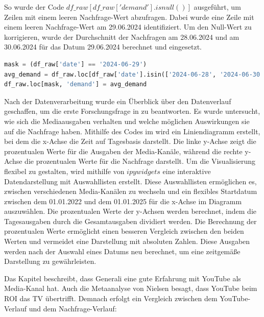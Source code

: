 So wurde der Code \(df\_raw[df\_raw['demand'].isnull()]\) ausgeführt, um Zeilen mit einem leeren Nachfrage-Wert abzufragen. Dabei wurde eine Zeile mit einem leeren Nachfrage-Wert am 29.06.2024 identifiziert. Um den Null-Wert zu korrigieren, wurde der Durchschnitt der Nachfragen am 28.06.2024 und am 30.06.2024 für das Datum 29.06.2024 berechnet und eingesetzt.  
\begin{lstlisting}[language=Python, linewidth=\textwidth]
mask = (df_raw['date'] == '2024-06-29')
avg_demand = df_raw.loc[df_raw['date'].isin(['2024-06-28', '2024-06-30']), 'demand'].mean()
df_raw.loc[mask, 'demand'] = avg_demand
\end{lstlisting}
Nach der Datenverarbeitung wurde ein Überblick über den Datenverlauf geschaffen, um die erste Forschungsfrage in 
zu beantworten. Es wurde untersucht, wie sich die Mediaausgaben verhalten und welche möglichen Auswirkungen sie auf die Nachfrage haben. Mithilfe des Codes im  wird ein Liniendiagramm erstellt, bei dem die x-Achse die Zeit auf Tagesbasis darstellt. Die linke y-Achse zeigt die prozentualen Werte für die Ausgaben der Media-Kanäle, während die rechte y-Achse die prozentualen Werte für die Nachfrage darstellt. Um die Visualisierung flexibel zu gestalten, wird mithilfe von \(ipywidgets\) eine interaktive Datendarstellung mit Auswahllisten erstellt. Diese Auswahllisten ermöglichen es, zwischen verschiedenen Media-Kanälen zu wechseln und ein flexibles Startdatum zwischen dem 01.01.2022 und dem 01.01.2025 für die x-Achse im Diagramm auszuwählen. Die prozentualen Werte der y-Achsen werden berechnet, indem die Tagesausgaben durch die Gesamtausgaben dividiert werden. Die Berechnung der prozentualen Werte ermöglicht einen besseren Vergleich zwischen den beiden Werten und vermeidet eine Darstellung mit absoluten Zahlen. Diese Ausgaben werden nach der Auswahl eines Datums neu berechnet, um eine zeitgemäße Darstellung zu gewährleisten. \par
Das Kapitel  beschreibt, dass Generali eine gute Erfahrung mit YouTube als Media-Kanal hat. Auch die Metaanalyse von Nielsen besagt, dass YouTube beim \ac{ROI} das TV übertrifft. Demnach erfolgt ein Vergleich zwischen dem YouTube-Verlauf und dem Nachfrage-Verlauf: \par
